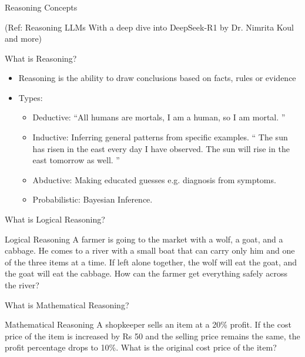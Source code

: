 \begin{frame}[fragile]\frametitle{}
\begin{center}
{\Large Reasoning Concepts}

{\tiny (Ref: Reasoning LLMs With a deep dive into DeepSeek-R1 by Dr. Nimrita Koul and more)}

\end{center}


\end{frame}


\begin{frame}[fragile]{What is Reasoning?}
    \begin{itemize}
        \item Reasoning is the ability to draw conclusions based on facts, rules or evidence
		\item Types:
			    \begin{itemize}
				\item  Deductive: ``All humans are mortals, I am a human, so I am mortal. ''
				\item  Inductive: Inferring general patterns from specific examples. `` The sun has risen in the east every day I have observed. The sun will rise in the east tomorrow as well. ''
				\item  Abductive: Making educated guesses e.g. diagnosis from symptoms.
				\item  Probabilistic: Bayesian Inference.
			\end{itemize}
    \end{itemize}
\end{frame}

\begin{frame}[fragile]{What is Logical Reasoning?}
    \begin{block}{Logical Reasoning}
		A farmer is going to the market with a wolf, a goat, 
		and a cabbage. He comes to a river with a small boat 
		that can carry only him and one of the three items at 
		a time. If left alone together, the wolf will eat the goat, 
		and the goat will eat the cabbage. How can the 
		farmer get everything safely across the river?
    \end{block}
\end{frame}

\begin{frame}[fragile]{What is Mathematical Reasoning?}
    \begin{block}{Mathematical Reasoning}
		 A shopkeeper sells an item at a 20\% profit. If the 
		cost price of the item is increased by Rs 50 and the 
		selling price remains the same, the profit 
		percentage drops to 10\%. What is the original cost 
		price of the item?
    \end{block}
\end{frame}

